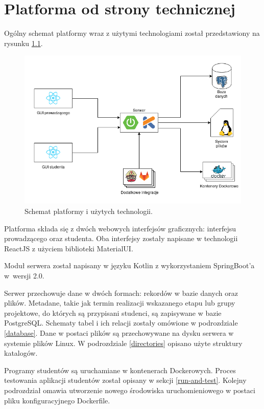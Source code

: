 \chapter{Platforma od strony technicznej}
\label{chapter:platform-technical}
Ogólny schemat platformy wraz z użytymi technologiami został przedstawiony na rysunku \ref{fig:platform-schema}.

\begin{figure}[h]
    \centering
    \includegraphics[width = 13cm]{chapter05/platform_schema.png}
    \caption{Schemat platformy i użytych technologii.}
    \label{fig:platform-schema}
\end{figure}

Platforma składa się z dwóch webowych interfejsów graficznych: interfejsu prowadzącego oraz studenta.
Oba interfejsy zostały napisane w technologii ReactJS z użyciem biblioteki MaterialUI.

Moduł serwera został napisany w języku Kotlin z wykorzystaniem SpringBoot’a w~wersji 2.0.

Serwer przechowuje dane w dwóch formach: rekordów w bazie danych oraz plików.
Metadane, takie jak termin realizacji wskazanego etapu lub grupy projektowe, do których są przypisani studenci, są zapisywane w bazie PostgreSQL.
Schematy tabel i ich relacji zostały omówione w podrozdziale \ref{database}.
Dane w postaci plików są przechowywane na dysku serwera w systemie plików Linux.
W podrozdziale \ref{directories} opisano użyte struktury katalogów.

Programy studentów są uruchamiane w kontenerach Dockerowych.
Proces testowania aplikacji studentów został opisany w sekcji \ref{run-and-test}.
Kolejny podrozdział omawia utworzenie nowego środowiska uruchomieniowego w postaci pliku konfiguracyjnego Dockerfile.

